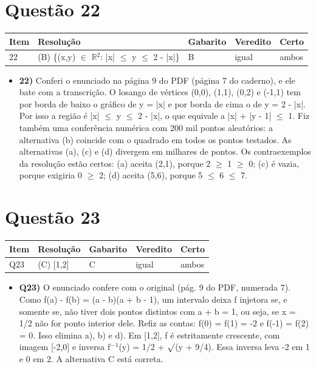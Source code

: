 \documentclass{article}%
\begin{document}
\section*{Questão 22}%
\begin{longtable}{@{}p{} p{} p{} p{} p{}@{}}\toprule Item & Resolução & Gabarito & Veredito & Certo \\ \midrule
22 & (B) \{(x,y) $\in$ $\mathbb{R}$$^2$: |x| $\leq$ y $\leq$ 2 - |x|\} & B & igual & ambos \\
\bottomrule\end{longtable}%
\begin{itemize}%
\item%
\textbf{22)} Conferi o enunciado na página 9 do PDF (página 7 do caderno), e ele bate com a transcrição. O losango de vértices (0,0), (1,1), (0,2) e (-1,1) tem por borda de baixo o gráfico de y = |x| e por borda de cima o de y = 2 - |x|. Por isso a região é |x| $\leq$ y $\leq$ 2 - |x|, o que equivale a |x| + |y - 1| $\leq$ 1. Fiz também uma conferência numérica com 200 mil pontos aleatórios: a alternativa (b) coincide com o quadrado em todos os pontos testados. As alternativas (a), (c) e (d) divergem em milhares de pontos. Os contraexemplos da resolução estão certos: (a) aceita (2,1), porque 2 $\geq$ 1 $\geq$ 0; (c) é vazia, porque exigiria 0 $\geq$ 2; (d) aceita (5,6), porque 5 $\leq$ 6 $\leq$ 7.%
\end{itemize}%
\section*{Questão 23}%
\begin{longtable}{@{}p{} p{} p{} p{} p{}@{}}\toprule Item & Resolução & Gabarito & Veredito & Certo \\ \midrule
Q23 & (C) {[}1,2{]} & C & igual & ambos \\
\bottomrule\end{longtable}%
\begin{itemize}%
\item%
\textbf{Q23)} O enunciado confere com o original (pág. 9 do PDF, numerada 7). Como f(a) - f(b) = (a - b)(a + b - 1), um intervalo deixa f injetora se, e somente se, não tiver dois pontos distintos com a + b = 1, ou seja, se x = 1/2 não for ponto interior dele. Refiz as contas: f(0) = f(1) = -2 e f(-1) = f(2) = 0. Isso elimina a), b) e d). Em {[}1,2{]}, f é estritamente crescente, com imagem {[}-2,0{]} e inversa f$^{-}$$^{1}$(y) = 1/2 + $\surd$(y + 9/4). Essa inversa leva -2 em 1 e 0 em 2. A alternativa C está correta.%
\end{itemize}%
\end{document}
